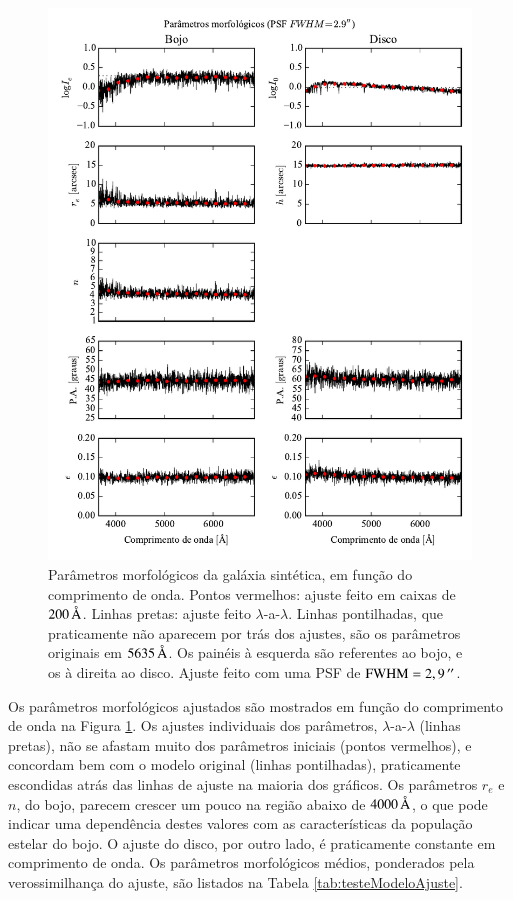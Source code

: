 \begin{figure}
	\includegraphics{figuras/simulation_fitparams}
	\caption[Parâmetros morfológicos da galáxia sintética]
	{Parâmetros morfológicos da galáxia sintética, em função do comprimento de
	onda. Pontos vermelhos: ajuste feito em caixas de $200\,\text{\normalfont\AA}$. Linhas
	pretas: ajuste feito $\lambda$-a-$\lambda$. Linhas pontilhadas, que
	praticamente não aparecem por trás dos ajustes, são os parâmetros originais em
	$5635\,\text{\normalfont\AA}$. Os painéis à esquerda são referentes ao bojo, e os à direita
	ao disco. Ajuste feito com uma PSF de $\mathrm{FWHM} = 2,9\,^{\prime\prime}$.
	}
	\label{fig:testFitParams}
\end{figure}

Os parâmetros morfológicos ajustados são mostrados em função do comprimento de
onda na Figura \ref{fig:testFitParams}. Os ajustes individuais dos parâmetros,
$\lambda$-a-$\lambda$ (linhas pretas), não se afastam muito dos parâmetros
iniciais (pontos vermelhos), e concordam bem com o modelo original (linhas
pontilhadas), praticamente escondidas atrás das linhas de ajuste na maioria dos
gráficos. Os parâmetros $r_e$ e $n$, do bojo, parecem crescer um pouco na região
abaixo de $4000\,\text{\normalfont\AA}$, o que pode indicar uma dependência destes valores
com as características da população estelar do bojo. O ajuste do disco, por
outro lado, é praticamente constante em comprimento de onda.
Os parâmetros morfológicos médios, ponderados pela verossimilhança do ajuste,
são listados na Tabela \ref{tab:testeModeloAjuste}.

